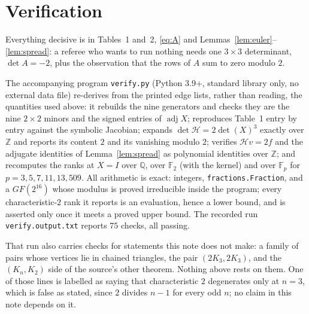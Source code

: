\documentclass[11pt]{amsart}
\theoremstyle{remark}
\DeclareMathOperator{\adj}{adj}
\newcommand{\Hm}{\mathcal H}
\newcommand{\FF}{\mathbb F}
\begin{document}
\section{Verification}

Everything decisive is in Tables~1 and~2, \eqref{eq:A} and
Lemmas~\ref{lem:euler}--\ref{lem:spread}: a referee who wants to run nothing
needs one $3\times3$ determinant, $\det A=-2$, plus the observation that the
rows of $A$ sum to zero modulo $2$.

The accompanying program \texttt{verify.py} (Python 3.9+, standard library
only, no external data file) re-derives from the printed edge lists, rather
than reading, the quantities used above: it rebuilds the nine generators and
checks they are the nine $2\times2$ minors and the signed entries of $\adj X$;
reproduces Table~1 entry by entry against the symbolic Jacobian; expands
$\det\Hm=2\det(X)^3$ exactly over $\mathbb Z$ and reports its content $2$ and
its vanishing modulo $2$; verifies $\Hm v=2f$ and the adjugate identities
of Lemma~\ref{lem:spread} as polynomial identities over $\mathbb Z$; and
recomputes the ranks at $X=I$ over $\mathbb Q$, over $\FF_2$ (with the kernel)
and over $\FF_p$ for $p=3,5,7,11,13,509$. All
arithmetic is exact: integers, \texttt{fractions.Fraction}, and a
$GF(2^{16})$ whose modulus is proved irreducible inside the program; every
characteristic-$2$ rank it reports is an evaluation, hence a lower bound, and
is asserted only once it meets a proved upper bound. The recorded run
\texttt{verify.output.txt} reports $75$ checks, all passing.

That run also carries checks for statements this note does not make: a family
of pairs whose vertices lie in chained triangles, the pair $(2K_3,2K_3)$, and
the $(K_n,K_2)$ side of the source's other theorem. Nothing above rests on
them. One of those lines is labelled as saying that characteristic $2$
degenerates only at $n=3$, which is false as stated, since $2$ divides $n-1$
for every odd $n$; no claim in this note depends on it.
\end{document}

